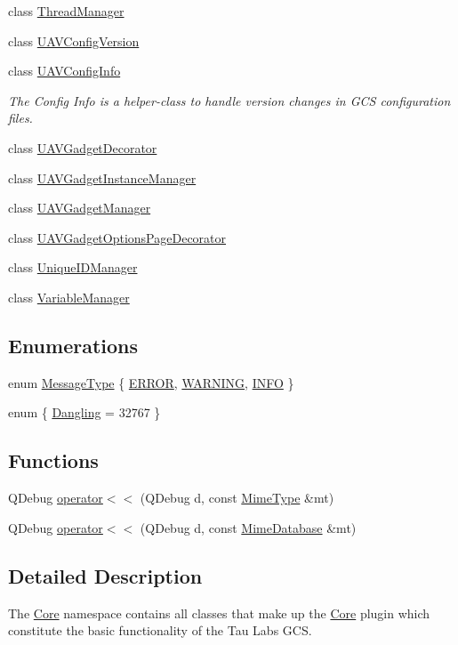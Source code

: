 \begin{DoxyCompactItemize}
class \hyperlink{class_core_1_1_thread_manager}{Thread\-Manager}
\item 
class \hyperlink{class_core_1_1_u_a_v_config_version}{U\-A\-V\-Config\-Version}
\item 
class \hyperlink{class_core_1_1_u_a_v_config_info}{U\-A\-V\-Config\-Info}
\begin{DoxyCompactList}\small\item\em The Config Info is a helper-\/class to handle version changes in G\-C\-S configuration files. \end{DoxyCompactList}\item 
class \hyperlink{class_core_1_1_u_a_v_gadget_decorator}{U\-A\-V\-Gadget\-Decorator}
\item 
class \hyperlink{class_core_1_1_u_a_v_gadget_instance_manager}{U\-A\-V\-Gadget\-Instance\-Manager}
\item 
class \hyperlink{class_core_1_1_u_a_v_gadget_manager}{U\-A\-V\-Gadget\-Manager}
\item 
class \hyperlink{class_core_1_1_u_a_v_gadget_options_page_decorator}{U\-A\-V\-Gadget\-Options\-Page\-Decorator}
\item 
class \hyperlink{class_core_1_1_unique_i_d_manager}{Unique\-I\-D\-Manager}
\item 
class \hyperlink{class_core_1_1_variable_manager}{Variable\-Manager}
\end{DoxyCompactItemize}
\subsection*{Enumerations}
\begin{DoxyCompactItemize}
\item 
enum \hyperlink{group___core_plugin_ga51bd6651e9cc7b45aeaff9bd5991be3d}{Message\-Type} \{ \hyperlink{group___core_plugin_gga51bd6651e9cc7b45aeaff9bd5991be3da1b81696793f3033d6741d6b8a59ac60a}{E\-R\-R\-O\-R}, 
\hyperlink{group___core_plugin_gga51bd6651e9cc7b45aeaff9bd5991be3dae0a166ed923f101d89729bd68e2ddc37}{W\-A\-R\-N\-I\-N\-G}, 
\hyperlink{group___core_plugin_gga51bd6651e9cc7b45aeaff9bd5991be3dac2a21b18b6a15f19347c6f1401dad9b6}{I\-N\-F\-O}
 \}
\item 
enum \{ \hyperlink{group___core_plugin_gga53f7f4dccaf625c89df1b42297204739a8312614a0b402ff5e3d6b897d3f84f18}{Dangling} = 32767
 \}
\end{DoxyCompactItemize}
\subsection*{Functions}
\begin{DoxyCompactItemize}
\item 
Q\-Debug \hyperlink{group___core_plugin_ga507400915fc308d3f7a295fd46aa8e8b}{operator$<$$<$} (Q\-Debug d, const \hyperlink{class_core_1_1_mime_type}{Mime\-Type} \&mt)
\item 
Q\-Debug \hyperlink{group___core_plugin_ga90cf57732d2c5688623991d6826ee082}{operator$<$$<$} (Q\-Debug d, const \hyperlink{class_core_1_1_mime_database}{Mime\-Database} \&mt)
\end{DoxyCompactItemize}


\subsection{Detailed Description}
The \hyperlink{namespace_core}{Core} namespace contains all classes that make up the \hyperlink{namespace_core}{Core} plugin which constitute the basic functionality of the Tau Labs G\-C\-S. 